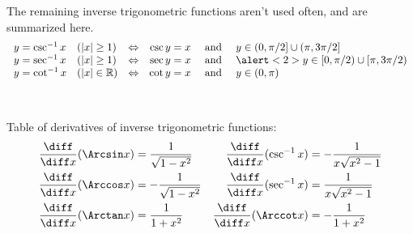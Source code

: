 \begin{frame}
The remaining inverse trigonometric functions aren't used often, and are summarized here.
\[
\begin{array}{llcrcl}
y = \csc^{-1} x &%
(|x| \geq 1) &%
\Leftrightarrow &%
\csc y = x &%
\text{ and } &%
y\in (0,\pi /2] \cup (\pi , 3\pi /2] \\%
y = \sec^{-1} x &%
(|x| \geq 1) &%
\Leftrightarrow &%
\sec y = x &%
\text{ and } &%
\alert<2>{y\in [0,\pi /2) \cup [\pi , 3\pi /2)} \\%
y = \cot^{-1} x &%
(|x| \in \mathbb{R}) &%
\Leftrightarrow &%
\cot y = x &%
\text{ and } &%
y\in (0,\pi )
\end{array}
\]

\ %
%
\end{frame}

\begin{frame}
Table of derivatives of inverse trigonometric functions: 
\begin{align*}
\frac{\diff}{\diff x} (\Arcsin x) & = %
\frac{1}{\sqrt{1-x^2}} &%
\frac{\diff}{\diff x} (\csc^{-1} x) & = %
-\frac{1}{x\sqrt{x^2-1}} \\%
\frac{\diff}{\diff x} (\Arccos x) & = %
-\frac{1}{\sqrt{1-x^2}} &%
\frac{\diff}{\diff x} (\sec^{-1} x) & = %
\frac{1}{x\sqrt{x^2-1}} \\%
\frac{\diff}{\diff x} (\Arctan x) & = %
\frac{1}{1+x^2} &%
\frac{\diff}{\diff x} (\Arccot x) & = %
-\frac{1}{1+x^2} %
\end{align*}
\end{frame}

